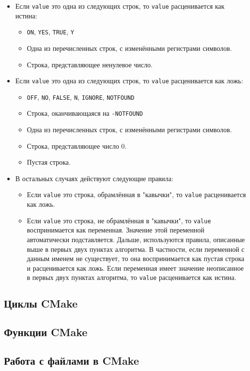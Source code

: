 \documentclass{article}
\begin{document}
\begin{itemize}
\item Если \texttt{value} это одна из следующих строк, то \texttt{value} расценивается как истина: 
\begin{itemize}
\item \texttt{ON}, \texttt{YES}, \texttt{TRUE}, \texttt{Y}
\item Одна из перечисленных строк, с изменёнными регистрами символов.
\item Строка, представляющее ненулевое число.
\end{itemize}

\item Если \texttt{value} это одна из следующих строк, то \texttt{value} расценивается как ложь:  
\begin{itemize}
\item \texttt{OFF}, \texttt{NO}, \texttt{FALSE}, \texttt{N}, \texttt{IGNORE}, \texttt{NOTFOUND}
\item Строка, оканчивающаяся на \texttt{-NOTFOUND}
\item Одна из перечисленных строк, с изменёнными регистрами символов.
\item Строка, представляющее число 0.
\item Пустая строка.
\end{itemize}


\item В остальных случаях действуют следующие правила:
\begin{itemize}
\item Если \texttt{value} это строка, обрамлённая в "кавычки"{}, то \texttt{value} расценивается как ложь.
\item Если \texttt{value} это строка, не обрамлённая в "кавычки"{}, то \texttt{value} воспринимается как переменная. Значение этой переменной автоматически подставляется. Дальше, используются правила, описанные выше в первых двух пунктах алгоритма. В частности, если переменной с данным именем не существует, то она воспринимается как пустая строка и расценивается как ложь. Если переменная имеет значение неописанное в первых двух пунктах алгоритма, то \texttt{value} расценивается как истина.
\end{itemize}
\end{itemize}

\subsection*{Циклы CMake}


\subsection*{Функции CMake}


\subsection*{Работа с файлами в CMake}
\end{document}
